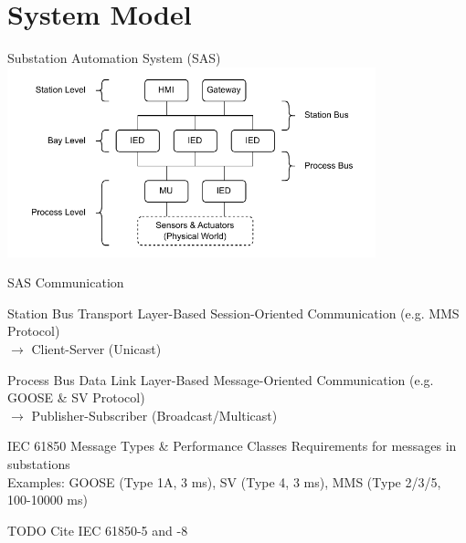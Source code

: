 \documentclass[en]{sdqbeamer}
\begin{document}
\section{System Model}
\begin{frame}{Substation Automation System (SAS)}
    \centering
	\includegraphics[width=0.8\textwidth]{./figures/substation_architecture.drawio.pdf}
\end{frame}

\begin{frame}{SAS Communication}
    \begin{blueblock}{Station Bus}
        Transport Layer-Based Session-Oriented Communication (e.g. MMS Protocol)
        \\$\rightarrow$ Client-Server (Unicast)
    \end{blueblock}
    \begin{blueblock}{Process Bus}
        Data Link Layer-Based Message-Oriented Communication (e.g. GOOSE \& SV Protocol)
        \\$\rightarrow$ Publisher-Subscriber (Broadcast/Multicast)
    \end{blueblock}
    \begin{grayblock}{IEC 61850 Message Types \& Performance Classes}
        Requirements for messages in substations
        \\Examples: GOOSE (Type 1A, 3 ms), SV (Type 4, 3 ms), MMS (Type 2/3/5, 100-10000 ms)
    \end{grayblock}
    TODO Cite IEC 61850-5 and -8
\end{frame}
\end{document}
